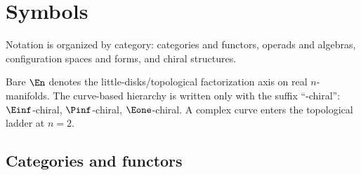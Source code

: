 \chapter{Symbols}
\label{app:notation}


Notation is organized by category: categories and functors, operads
and algebras, configuration spaces and forms, and chiral structures.

\begin{remark}
Bare $\En$ denotes the little-disks/topological factorization axis on
real $n$-manifolds. The curve-based hierarchy is written only with the
suffix ``-chiral'': $\Einf$-chiral, $\Pinf$-chiral, $\Eone$-chiral.
A complex curve enters the topological ladder at $n = 2$.
\end{remark}

\section{Categories and functors}
\label{sec:notation-categories}

